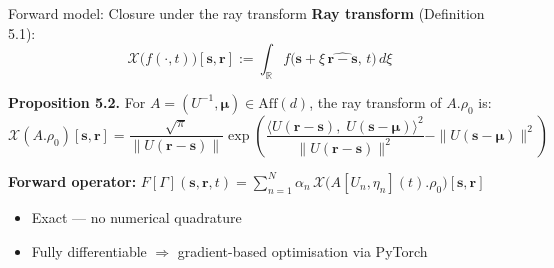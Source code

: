 \documentclass{beamer}
\begin{document}
    \begin{frame}{Forward model: Closure under the ray transform}
        \textbf{Ray transform} (Definition 5.1):
        $$
            \mathcal{X}\bigl(f(\cdot, t)\bigr)[\mathbf{s}, \mathbf{r}] := \int_{\mathbb{R}} f\bigl(\mathbf{s} + \xi\,\widehat{\mathbf{r} - \mathbf{s}},\, t\bigr)\,d\xi
        $$

        \pause
        \vspace{0.3em}
        \textbf{Proposition 5.2.} For $A = (U^{-1}, \boldsymbol{\mu}) \in \mathrm{Aff}(d)$, the ray transform of $A.\rho_0$ is:
        $$
            \mathcal{X}(A.\rho_0)[\mathbf{s}, \mathbf{r}]
            = \frac{\sqrt{\pi}}{\|U(\mathbf{r} - \mathbf{s})\|}
            \exp\!\left(
            \frac{
              \bigl\langle U(\mathbf{r} - \mathbf{s}),\; U(\mathbf{s} - \boldsymbol{\mu})\bigr\rangle^2
            }{
              \|U(\mathbf{r} - \mathbf{s})\|^2
            }
            - \|U(\mathbf{s} - \boldsymbol{\mu})\|^2\right)
        $$

        \vspace{0.3em}
        \textbf{Forward operator:}
        $\displaystyle
            F[\Gamma](\mathbf{s}, \mathbf{r}, t) = \sum_{n=1}^{N} \alpha_n\, \mathcal{X}\bigl(A[U_n, \eta_n](t).\rho_0\bigr)[\mathbf{s}, \mathbf{r}]
        $

        \vspace{0.3em}
        \begin{itemize}
            \item Exact --- no numerical quadrature
            \item Fully differentiable $\Rightarrow$ gradient-based optimisation via PyTorch
        \end{itemize}

    \end{frame}
\end{document}
